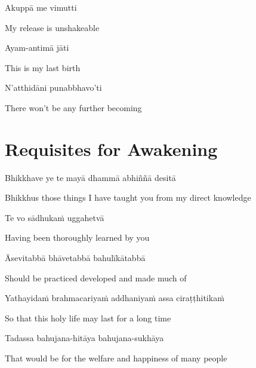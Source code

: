 Akuppā me vimutti

\begin{cprenglish}
  My release is unshakeable
\end{cprenglish}

Ayam-antimā jāti

\begin{cprenglish}
  This is my last birth
\end{cprenglish}

N’atthidāni punabbhavo’ti

\begin{cprenglish}
  There won’t be any further becoming
\end{cprenglish}


\clearpage

\section{Requisites for Awakening}

\begin{leader}
\end{leader}

Bhikkhave ye te mayā dhammā abhiññā desitā

\begin{cprenglish}
  Bhikkhus those things I have taught you from my direct knowledge
\end{cprenglish}

Te vo sādhukaṁ uggahetvā

\begin{cprenglish}
  Having been thoroughly learned by you
\end{cprenglish}

Āsevitabbā bhāvetabbā bahulīkātabbā

\begin{cprenglish}
  Should be practiced developed and made much of
\end{cprenglish}

Yathayidaṁ brahmacariyaṁ addhaniyaṁ assa ciraṭṭhitikaṁ

\begin{cprenglish}
  So that this holy life may last for a long time
\end{cprenglish}

Tadassa bahujana-hitāya bahujana-sukhāya

\begin{cprenglish}
  That would be for the welfare and happiness of many people
\end{cprenglish}

